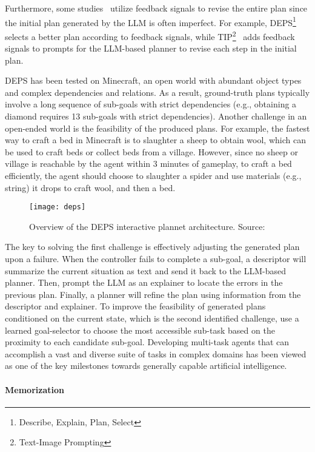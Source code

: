 Furthermore, some studies~\cite{hao2022structured, wang2023describeexplainplanselect} utilize feedback signals to revise the entire plan since the initial plan generated by the LLM is often imperfect.
For example, DEPS\footnote{Describe, Explain, Plan, Select}~\cite{wang2023describeexplainplanselect} selects a better plan according to feedback signals, while TIP\footnote{Text-Image Prompting}~\cite{lu2023multimodal} adds feedback signals to prompts for the LLM-based planner to revise each step in the initial plan.

DEPS has been tested on Minecraft, an open world with abundant object types and complex dependencies and relations.
As a result, ground-truth plans typically involve a long sequence of sub-goals with strict dependencies (e.g., obtaining a diamond requires 13 sub-goals with strict dependencies).
Another challenge in an open-ended world is the feasibility of the produced plans.
For example, the fastest way to craft a bed in Minecraft is to slaughter a sheep to obtain wool, which can be used to craft beds or collect beds from a village.
However, since no sheep or village is reachable by the agent within 3 minutes of gameplay, to craft a bed efficiently, the agent should choose to slaughter a spider and use materials (e.g., string) it drops to craft wool, and then a bed.
\begin{figure}[h!]
	\centering
	\texttt{[image: deps]}
	\caption{Overview of the DEPS interactive plannet architecture. Source: \textcite{wang2023describeexplainplanselect}}
	\label{fig:deps}
\end{figure}
The key to solving the first challenge is effectively adjusting the generated plan upon a failure.
When the controller fails to complete a sub-goal, a descriptor will summarize the current situation as text and send it back to the LLM-based planner.
Then, prompt the LLM as an explainer to locate the errors in the previous plan.
Finally, a planner will refine the plan using information from the descriptor and explainer.
To improve the feasibility of generated plans conditioned on the current state, which is the second identified challenge, \textcite{wang2023describeexplainplanselect} use a learned goal-selector to choose the most accessible sub-task based on the proximity to each candidate sub-goal.
Developing multi-task agents that can accomplish a vast and diverse suite of tasks in complex domains has been viewed as one of the key milestones towards generally capable artificial intelligence.

\paragraph{Memorization}
\label{par:memorization}

